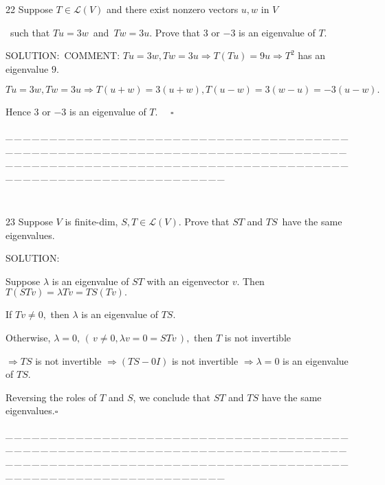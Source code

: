 \documentclass[a4paper, 11pt, UTF8]{article}
\def\Lm{\mathcal{L}}
\begin{document}
\begin{large}
{\timesbf\Large 22} {\timessl\Large 
Suppose $T\in\Lm(V)$ and there exist nonzero vectors $u,w$ in $V$}\par\quad\,
{\timessl\Large such that $Tu = 3w$ \,{\normalsize\timessl and}\, $Tw = 3u$. Prove that $3$ or $-3$ is an eigenvalue of $T$.
}\par
{\timesbf S\footnotesize{OLUTION:}}\,\,\,{\small C{\scriptsize OMMENT}: $Tu=3w,Tw=3u\Rightarrow T(Tu)=9u\Rightarrow T^2$ has an eigenvalue $9.$}\par\quad
$Tu=3w,Tw=3u\Rightarrow T(u+w)=3(u+w),T(u-w)=3(w-u)=-3(u-w).$\par\quad
Hence $3$ or $-3$ is an eigenvalue of $T.$ $\quad\square$\par
{\tiny \_\,\_\,\_\,\_\,\_\,\_\,\_\,\_\,\_\,\_\,\_\,\_\,\_\,\_\,\_\,\_\,\_\,\_\,\_\,\_\,\_\,\_\,\_\,\_\,\_\,\_\,\_\,\_\,\_\,\_\,\_\,\_\,\_\,\_\,\_\,\_\,\_\,\_\,\_\,\_\,\_\,\_\,\_\,\_\,\_\,\_\,\_\,\_\,\_\,\_\,\_\,\_\,\_\,\_\,\_\,\_\,\_\,\_\,\_\,\_\,\_\,\_\,\_\,\_\,\_\,\_\,\_\,\_\,\_\,\_\,\_\_\,\_\,\_\,\_\,\_\,\_\,\_\,\_\,\_\,\_\,\_\,\_\,\_\,\_\,\_\,\_\,\_\,\_\,\_\,\_\,\_\,\_\,\_\,\_\,\_\,\_\,\_\,\_\,\_\,\_\,\_\,\_\,\_\,\_\,\_\,\_\,\_\,\_\,\_\,\_\,\_\,\_\,\_\,\_\,\_\,\_\,\_\,\_\,\_\,\_\,\_\,\_\,\_\,\_\,\_\,\_\,\_\,\_\,\_\,\_\,\_\,\_\,\_\,\_\,\_\,\_\,\_\,\_\,\_\,\_\,\_}\par{\tiny\,\par}

{\timesbf\Large 23} {\timessl\Large 
Suppose $V$ is finite-dim, $S, T\in\Lm(V)$. Prove that $ST$ and $TS$\, have the same eigenvalues.}\par
{\timesbf S\footnotesize{OLUTION:}}\par\quad
Suppose $\lambda$ is an eigenvalue of $ST$ with an eigenvector $v.$ Then $T(STv)=\lambda Tv=TS(Tv).$\par\quad
If $Tv\neq 0,$ then $\lambda$ is an eigenvalue of $TS.$\par\quad
Otherwise, $\lambda=0,\,(\,v\neq 0,\lambda v=0=STv\,),$ then $T$ is not invertible\par\qquad\qquad
 $\Rightarrow TS$ is not invertible $\Rightarrow (TS-0I)$ is not invertible $\Rightarrow \lambda=0$ is an eigenvalue of $TS.$\par\quad
Reversing the roles of $T$ and $S$, we conclude that $ST$ and $TS$ have the same eigenvalues.\quad$\square$\par
{\tiny \_\,\_\,\_\,\_\,\_\,\_\,\_\,\_\,\_\,\_\,\_\,\_\,\_\,\_\,\_\,\_\,\_\,\_\,\_\,\_\,\_\,\_\,\_\,\_\,\_\,\_\,\_\,\_\,\_\,\_\,\_\,\_\,\_\,\_\,\_\,\_\,\_\,\_\,\_\,\_\,\_\,\_\,\_\,\_\,\_\,\_\,\_\,\_\,\_\,\_\,\_\,\_\,\_\,\_\,\_\,\_\,\_\,\_\,\_\,\_\,\_\,\_\,\_\,\_\,\_\,\_\,\_\,\_\,\_\,\_\,\_\_\,\_\,\_\,\_\,\_\,\_\,\_\,\_\,\_\,\_\,\_\,\_\,\_\,\_\,\_\,\_\,\_\,\_\,\_\,\_\,\_\,\_\,\_\,\_\,\_\,\_\,\_\,\_\,\_\,\_\,\_\,\_\,\_\,\_\,\_\,\_\,\_\,\_\,\_\,\_\,\_\,\_\,\_\,\_\,\_\,\_\,\_\,\_\,\_\,\_\,\_\,\_\,\_\,\_\,\_\,\_\,\_\,\_\,\_\,\_\,\_\,\_\,\_\,\_\,\_\,\_\,\_\,\_\,\_\,\_\,\_}\par


\end{large}
\end{document}
